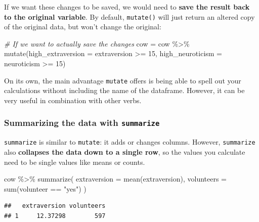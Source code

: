 \documentclass[
]{book}
\newenvironment{Shaded}{\begin{snugshade}}{\end{snugshade}}
\newcommand{\AttributeTok}[1]{\textcolor[rgb]{0.77,0.63,0.00}{#1}}
\newcommand{\CommentTok}[1]{\textcolor[rgb]{0.56,0.35,0.01}{\textit{#1}}}
\newcommand{\DecValTok}[1]{\textcolor[rgb]{0.00,0.00,0.81}{#1}}
\newcommand{\FunctionTok}[1]{\textcolor[rgb]{0.00,0.00,0.00}{#1}}
\newcommand{\NormalTok}[1]{#1}
\newcommand{\OtherTok}[1]{\textcolor[rgb]{0.56,0.35,0.01}{#1}}
\newcommand{\SpecialCharTok}[1]{\textcolor[rgb]{0.00,0.00,0.00}{#1}}
\newcommand{\StringTok}[1]{\textcolor[rgb]{0.31,0.60,0.02}{#1}}
\begin{document}
If we want these changes to be saved, we would need to \textbf{save the
result back to the original variable}. By default, \texttt{mutate()} will
just return an altered copy of the original data, but won't change
the original:

\begin{Shaded}
\begin{Highlighting}[]
\CommentTok{\# If we want to actually save the changes}
\NormalTok{cow }\OtherTok{=}\NormalTok{ cow }\SpecialCharTok{\%\textgreater{}\%}
    \FunctionTok{mutate}\NormalTok{(}\AttributeTok{high\_extraversion =}\NormalTok{ extraversion }\SpecialCharTok{\textgreater{}=} \DecValTok{15}\NormalTok{,}
           \AttributeTok{high\_neuroticism =}\NormalTok{ neuroticism }\SpecialCharTok{\textgreater{}=} \DecValTok{15}\NormalTok{)}
\end{Highlighting}
\end{Shaded}

On its own, the main advantage \texttt{mutate} offers is being able to spell
out your calculations without including the name of the dataframe. However,
it can be very useful in combination with other verbs.

\hypertarget{summarizing-the-data-with-summarize}{%
\subsubsection*{\texorpdfstring{Summarizing the data with \texttt{summarize}}{Summarizing the data with summarize}}\label{summarizing-the-data-with-summarize}}

\texttt{summarize} is similar to \texttt{mutate}: it adds or changes columns. However,
\texttt{summarize} also \textbf{collapses the data down to a single row}, so the
values you calculate need to be single values like means or counts.

\begin{Shaded}
\begin{Highlighting}[]
\NormalTok{cow }\SpecialCharTok{\%\textgreater{}\%}
    \FunctionTok{summarize}\NormalTok{(}
        \AttributeTok{extraversion =} \FunctionTok{mean}\NormalTok{(extraversion),}
        \AttributeTok{volunteers =} \FunctionTok{sum}\NormalTok{(volunteer }\SpecialCharTok{==} \StringTok{"yes"}\NormalTok{)}
\NormalTok{    )}
\end{Highlighting}
\end{Shaded}

\begin{verbatim}
##   extraversion volunteers
## 1     12.37298        597
\end{verbatim}
\end{document}
